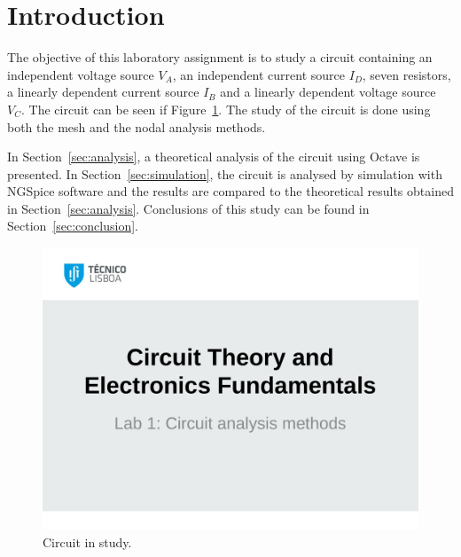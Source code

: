 \section{Introduction}
\label{sec:introduction}

The objective of this laboratory assignment is to study a circuit containing an
independent voltage source $V_A$, an independent current source $I_D$, seven resistors, 
a linearly dependent current source $I_B$ and a linearly dependent voltage source $V_C$.
The circuit can be seen if Figure~\ref{fig:t1}. The study of the circuit is done using 
both the mesh and the nodal analysis methods.


In Section~\ref{sec:analysis}, a theoretical analysis of the circuit using Octave is
presented. In Section~\ref{sec:simulation}, the circuit is analysed by
simulation with NGSpice software and the results are compared to the theoretical results obtained in
Section~\ref{sec:analysis}. Conclusions of this study can be found in
Section~\ref{sec:conclusion}.

\begin{figure}[htp] \centering
\includegraphics[width=0.8\linewidth]{t1.pdf}
\caption{Circuit in study.}
\label{fig:t1}
\end{figure}
\FloatBarrier

